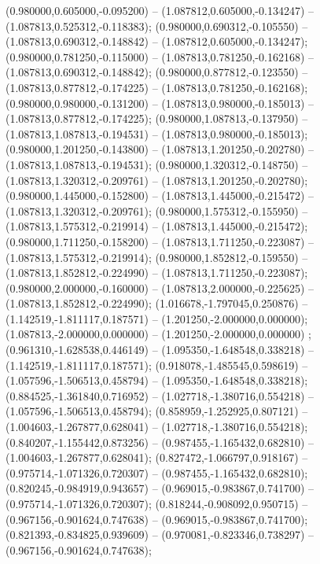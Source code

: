  (0.980000,0.605000,-0.095200) -- (1.087812,0.605000,-0.134247) -- (1.087813,0.525312,-0.118383);
 (0.980000,0.690312,-0.105550) -- (1.087813,0.690312,-0.148842) -- (1.087812,0.605000,-0.134247);
 (0.980000,0.781250,-0.115000) -- (1.087813,0.781250,-0.162168) -- (1.087813,0.690312,-0.148842);
 (0.980000,0.877812,-0.123550) -- (1.087813,0.877812,-0.174225) -- (1.087813,0.781250,-0.162168);
 (0.980000,0.980000,-0.131200) -- (1.087813,0.980000,-0.185013) -- (1.087813,0.877812,-0.174225);
 (0.980000,1.087813,-0.137950) -- (1.087813,1.087813,-0.194531) -- (1.087813,0.980000,-0.185013);
 (0.980000,1.201250,-0.143800) -- (1.087813,1.201250,-0.202780) -- (1.087813,1.087813,-0.194531);
 (0.980000,1.320312,-0.148750) -- (1.087813,1.320312,-0.209761) -- (1.087813,1.201250,-0.202780);
 (0.980000,1.445000,-0.152800) -- (1.087813,1.445000,-0.215472) -- (1.087813,1.320312,-0.209761);
 (0.980000,1.575312,-0.155950) -- (1.087813,1.575312,-0.219914) -- (1.087813,1.445000,-0.215472);
 (0.980000,1.711250,-0.158200) -- (1.087813,1.711250,-0.223087) -- (1.087813,1.575312,-0.219914);
 (0.980000,1.852812,-0.159550) -- (1.087813,1.852812,-0.224990) -- (1.087813,1.711250,-0.223087);
 (0.980000,2.000000,-0.160000) -- (1.087813,2.000000,-0.225625) -- (1.087813,1.852812,-0.224990);
 (1.016678,-1.797045,0.250876) -- (1.142519,-1.811117,0.187571) -- (1.201250,-2.000000,0.000000);
 (1.087813,-2.000000,0.000000) -- (1.201250,-2.000000,0.000000) ;
 (0.961310,-1.628538,0.446149) -- (1.095350,-1.648548,0.338218) -- (1.142519,-1.811117,0.187571);
 (0.918078,-1.485545,0.598619) -- (1.057596,-1.506513,0.458794) -- (1.095350,-1.648548,0.338218);
 (0.884525,-1.361840,0.716952) -- (1.027718,-1.380716,0.554218) -- (1.057596,-1.506513,0.458794);
 (0.858959,-1.252925,0.807121) -- (1.004603,-1.267877,0.628041) -- (1.027718,-1.380716,0.554218);
 (0.840207,-1.155442,0.873256) -- (0.987455,-1.165432,0.682810) -- (1.004603,-1.267877,0.628041);
 (0.827472,-1.066797,0.918167) -- (0.975714,-1.071326,0.720307) -- (0.987455,-1.165432,0.682810);
 (0.820245,-0.984919,0.943657) -- (0.969015,-0.983867,0.741700) -- (0.975714,-1.071326,0.720307);
 (0.818244,-0.908092,0.950715) -- (0.967156,-0.901624,0.747638) -- (0.969015,-0.983867,0.741700);
 (0.821393,-0.834825,0.939609) -- (0.970081,-0.823346,0.738297) -- (0.967156,-0.901624,0.747638);
